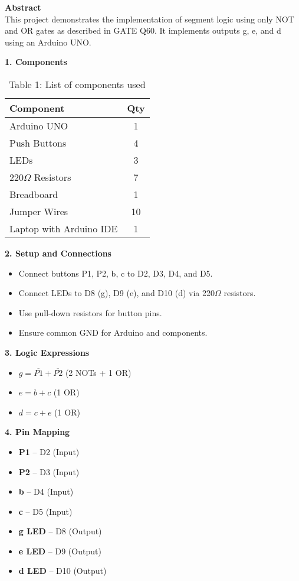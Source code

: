 \documentclass[12pt]{article}
\begin{document}
\begin{multicols}{2}

\noindent\textbf{Abstract} \\[0.5em]
This project demonstrates the implementation of segment logic using only NOT and OR gates as described in GATE Q60. It implements outputs g, e, and d using an Arduino UNO.

\vspace{1em}
\noindent\textbf{1. Components}
\begin{table}[H]
\small
\centering
\begin{tabular}{|p{4.2cm}|c|}
\hline
\textbf{Component} & \textbf{Qty} \\
\hline
Arduino UNO & 1 \\
Push Buttons & 4 \\
LEDs & 3 \\
220$\Omega$ Resistors & 7 \\
Breadboard & 1 \\
Jumper Wires & 10 \\
Laptop with Arduino IDE & 1 \\
\hline
\end{tabular}
\caption*{Table 1: List of components used}
\end{table}

\vspace{1em}
\noindent\textbf{2. Setup and Connections}
\begin{itemize}
    \item Connect buttons P1, P2, b, c to D2, D3, D4, and D5.
    \item Connect LEDs to D8 (g), D9 (e), and D10 (d) via 220$\Omega$ resistors.
    \item Use pull-down resistors for button pins.
    \item Ensure common GND for Arduino and components.
\end{itemize}

\vspace{1em}
\noindent\textbf{3. Logic Expressions}
\begin{itemize}
    \item $g = \overline{P1} + \overline{P2}$ (2 NOTs + 1 OR)
    \item $e = b + c$ (1 OR)
    \item $d = c + e$ (1 OR)
\end{itemize}

\vspace{1em}
\noindent\textbf{4. Pin Mapping}
\begin{itemize}
    \item \textbf{P1} – D2 (Input)
    \item \textbf{P2} – D3 (Input)
    \item \textbf{b} – D4 (Input)
    \item \textbf{c} – D5 (Input)
    \item \textbf{g LED} – D8 (Output)
    \item \textbf{e LED} – D9 (Output)
    \item \textbf{d LED} – D10 (Output)
\end{itemize}


\end{multicols}
\end{document}
